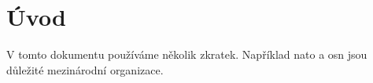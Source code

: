 \documentclass{article}
\begin{document}
\tableofcontents

\section{Úvod}

V tomto dokumentu používáme několik zkratek. Například \gls{nato} a \gls{osn} jsou důležité mezinárodní organizace.

\printglossary[type=\acronymtype, title={Seznam zkratek}]
\end{document}

